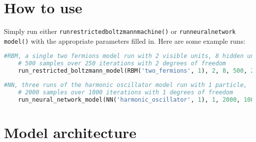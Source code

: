 \documentclass[12pt]{article}
\begin{document}
{\section{How to use} \label{howto}
Simply run either \texttt{run\textunderscore restricted\textunderscore boltzmann\textunderscore machine()} or \texttt{run\textunderscore neural\textunderscore network \textunderscore model()} with the appropriate parameters filled in. Here are some example runs:
\begin{lstlisting}[language=Python]
    #RBM, a single two fermions model run with 2 visible units, 8 hidden units, 
    # 500 samples over 250 iterations with 2 degrees of freedom
    run_restricted_boltzmann_model(RBM('two_fermions', 1), 2, 8, 500, 250, 1, 2)
\end{lstlisting}
\begin{lstlisting}[language=Python]
    #NN, three runs of the harmonic oscillator model run with 1 particle, 
    # 2000 samples over 1000 iterations with 1 degrees of freedom
    run_neural_network_model(NN('harmonic_oscillator', 1), 1, 2000, 1000, 3, 1)
\end{lstlisting}
\newpage
\section{Model architecture}
}
\end{document}
